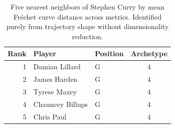 \begin{table}[htbp]
  \centering\small
  \begin{tabular}{rllc}
    \toprule
    Rank & Player & Position & Archetype \\
    \midrule
    1 & Damian Lillard & G & 4 \\
    2 & James Harden & G & 4 \\
    3 & Tyrese Maxey & G & 4 \\
    4 & Chauncey Billups & G & 4 \\
    5 & Chris Paul & G & 4 \\
    \bottomrule
  \end{tabular}
  \caption{Five nearest neighbors of Stephen Curry by mean Fr\'{e}chet curve distance across metrics. Identified purely from trajectory shape without dimensionality reduction.}
  \label{tab:Stephen_Curry_frechet_curve_neighbors}
\end{table}

